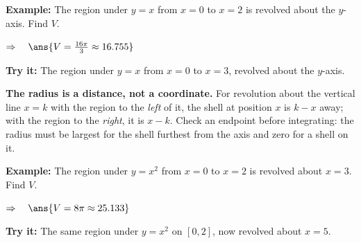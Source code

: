 \documentclass[12pt]{article}
\begin{document}
\begin{examplebox}
\textbf{Example:} \quad The region under $y = x$ from $x = 0$ to $x = 2$ is revolved about the $y$-axis. Find $V$.

$\Rightarrow\quad \ans{V = \frac{16\pi}{3} \approx 16.755}$
\end{examplebox}

\begin{tryitbox}
\textbf{Try it:} \quad The region under $y = x$ from $x = 0$ to $x = 3$, revolved about the $y$-axis.\\[2pt]
\end{tryitbox}


\begin{formulabox}
\textbf{The radius is a distance, not a coordinate.} For revolution about the vertical line $x = k$ with the region to the \emph{left} of it, the shell at position $x$ is $k - x$ away; with the region to the \emph{right}, it is $x - k$. Check an endpoint before integrating: the radius must be largest for the shell furthest from the axis and zero for a shell on it.
\end{formulabox}

\begin{examplebox}
\textbf{Example:} \quad The region under $y = x^2$ from $x = 0$ to $x = 2$ is revolved about $x = 3$. Find $V$.

$\Rightarrow\quad \ans{V = 8\pi \approx 25.133}$
\end{examplebox}

\begin{tryitbox}
\textbf{Try it:} \quad The same region under $y = x^2$ on $[0,2]$, now revolved about $x = 5$.\\[2pt]
\end{tryitbox}
\end{document}
